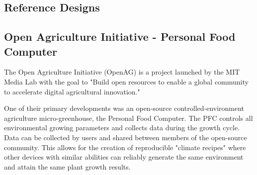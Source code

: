 \documentclass{report}
\begin{document}
\begin{appendices}
\newpage
\section{Reference Designs}


\subsection{Open Agriculture Initiative - Personal Food Computer}




The Open Agriculture Initiative (OpenAG) is a project launched by the MIT Media Lab with the goal to "Build open resources to enable a global community to accelerate digital agricultural innovation." 

One of their primary developments was an open-source controlled-environment agriculture micro-greenhouse, the Personal Food Computer.
The PFC controls all environmental growing parameters and collects data during the growth cycle.
Data can be collected by users and shared between members of the open-source community.
This allows for the creation of reproducible "climate recipes" where other devices with similar abilities can reliably generate the same environment and attain the same plant growth results.



\end{appendices}
\end{document}
